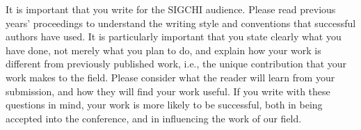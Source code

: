 \documentclass{sigchi}
\begin{document}
It is important that you write for the SIGCHI audience. Please read
previous years' proceedings to understand the writing style and
conventions that successful authors have used. It is particularly
important that you state clearly what you have done, not merely what
you plan to do, and explain how your work is different from previously
published work, i.e., the unique contribution that your work makes to
the field. Please consider what the reader will learn from your
submission, and how they will find your work useful. If you write with
these questions in mind, your work is more likely to be successful,
both in being accepted into the conference, and in influencing the
work of our field.



\end{document}
